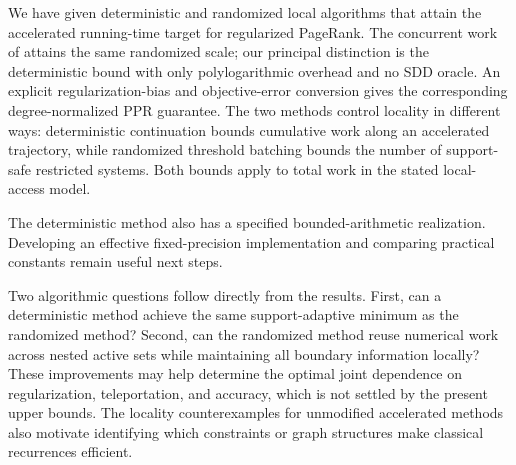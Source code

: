 We have given deterministic and randomized local algorithms that attain
the accelerated running-time target for regularized PageRank. The concurrent
work of \citet{cui2026accelerating} attains the same randomized scale;
our principal distinction is the deterministic bound with only
polylogarithmic overhead and no SDD oracle. An explicit
regularization-bias and objective-error conversion gives the corresponding
degree-normalized PPR guarantee. The two methods control locality in
different ways: deterministic continuation bounds cumulative work along
an accelerated trajectory, while randomized threshold batching bounds the
number of support-safe restricted systems. Both bounds apply to total
work in the stated local-access model.

The deterministic method also has a specified bounded-arithmetic
realization. Developing an effective fixed-precision implementation and
comparing practical constants remain useful next steps.

Two algorithmic questions follow directly from the results. First, can a
deterministic method achieve the same support-adaptive minimum as the
randomized method? Second, can the randomized method reuse numerical work
across nested active sets while maintaining all boundary information
locally? These improvements may help determine the optimal joint
dependence on regularization, teleportation, and accuracy, which is not
settled by the present upper bounds. The locality counterexamples for
unmodified accelerated methods also motivate identifying which constraints
or graph structures make classical recurrences efficient.
